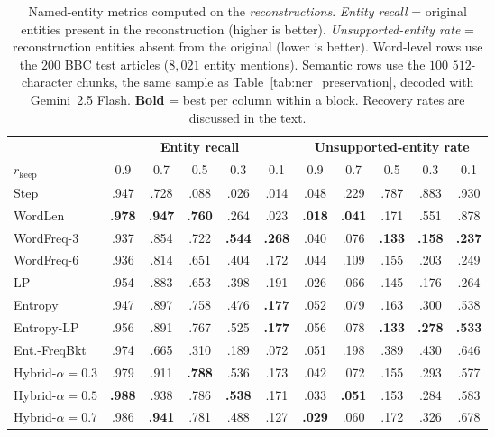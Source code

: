 \documentclass[11pt]{article}
\newcommand{\rkeep}{r_{\mathrm{keep}}}
\begin{document}
\begin{table}[t]
\centering
\small
\setlength{\tabcolsep}{5pt}
\caption{Named-entity metrics computed on the \emph{reconstructions}. \emph{Entity recall} = original
entities present in the reconstruction (higher is better). \emph{Unsupported-entity rate} = reconstruction
entities absent from the original (lower is better). Word-level rows use the $200$ BBC test articles
($8{,}021$ entity mentions). Semantic rows use the $100$ $512$-character chunks, the same sample as
Table~\ref{tab:ner_preservation}, decoded with Gemini~2.5 Flash. \textbf{Bold} = best per column within a block. Recovery rates are
discussed in the text.}
\label{tab:ner_recon}
\begin{tabular}{l ccccc ccccc}
\toprule
& \multicolumn{5}{c}{\textbf{Entity recall}} & \multicolumn{5}{c}{\textbf{Unsupported-entity rate}} \\
\cmidrule(lr){2-6}\cmidrule(lr){7-11}
$\rkeep$ & 0.9 & 0.7 & 0.5 & 0.3 & 0.1 & 0.9 & 0.7 & 0.5 & 0.3 & 0.1 \\
\midrule
Step                   & .947 & .728 & .088 & .026 & .014 & .048 & .229 & .787 & .883 & .930 \\
WordLen                & \textbf{.978} & \textbf{.947} & \textbf{.760} & .264 & .023 & \textbf{.018} & \textbf{.041} & .171 & .551 & .878 \\
WordFreq-3             & .937 & .854 & .722 & \textbf{.544} & \textbf{.268} & .040 & .076 & \textbf{.133} & \textbf{.158} & \textbf{.237} \\
WordFreq-6             & .936 & .814 & .651 & .404 & .172 & .044 & .109 & .155 & .203 & .249 \\
LP                     & .954 & .883 & .653 & .398 & .191 & .026 & .066 & .145 & .176 & .264 \\
\midrule
Entropy                & .947 & .897 & .758 & .476 & \textbf{.177} & .052 & .079 & .163 & .300 & .538 \\
Entropy-LP             & .956 & .891 & .767 & .525 & \textbf{.177} & .056 & .078 & \textbf{.133} & \textbf{.278} & \textbf{.533} \\
Ent.-FreqBkt           & .974 & .665 & .310 & .189 & .072 & .051 & .198 & .389 & .430 & .646 \\
Hybrid-$\alpha{=}0.3$  & .979 & .911 & \textbf{.788} & .536 & .173 & .042 & .072 & .155 & .293 & .577 \\
Hybrid-$\alpha{=}0.5$  & \textbf{.988} & .938 & .786 & \textbf{.538} & .171 & .033 & \textbf{.051} & .153 & .284 & .583 \\
Hybrid-$\alpha{=}0.7$  & .986 & \textbf{.941} & .781 & .488 & .127 & \textbf{.029} & .060 & .172 & .326 & .678 \\
\bottomrule
\end{tabular}
\end{table}
\end{document}
